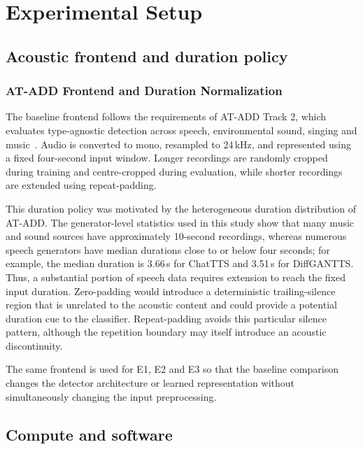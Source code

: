 \chapter{Experimental Setup}
\label{ch:setup}

\section{Acoustic frontend and duration policy}
\label{sec:setup-frontend}

\subsection{AT-ADD Frontend and Duration Normalization}
\label{sec:duration-norm}

The baseline frontend follows the requirements of AT-ADD Track 2, which evaluates type-agnostic detection across speech, environmental sound, singing and music~\cite{xie2026atadd}. Audio is converted to mono, resampled to 24\,kHz, and represented using a fixed four-second input window. Longer recordings are randomly cropped during training and centre-cropped during evaluation, while shorter recordings are extended using repeat-padding.

This duration policy was motivated by the heterogeneous duration distribution of AT-ADD. The generator-level statistics used in this study show that many music and sound sources have approximately 10-second recordings, whereas numerous speech generators have median durations close to or below four seconds; for example, the median duration is 3.66\,s for ChatTTS and 3.51\,s for DiffGANTTS. Thus, a substantial portion of speech data requires extension to reach the fixed input duration. Zero-padding would introduce a deterministic trailing-silence region that is unrelated to the acoustic content and could provide a potential duration cue to the classifier. Repeat-padding avoids this particular silence pattern, although the repetition boundary may itself introduce an acoustic discontinuity.

The same frontend is used for E1, E2 and E3 so that the baseline comparison changes the detector architecture or learned representation without simultaneously changing the input preprocessing.

\section{Compute and software}
\label{sec:compute}

